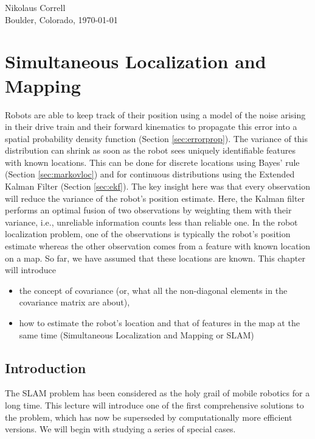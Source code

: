 \documentclass[paper=6.14in:9.21in,pagesize=pdftex,11pt,twoside,openright]{scrbook}
\begin{document}
\begin{flushright}
Nikolaus Correll\\
Boulder, Colorado, \today
\end{flushright}

















\chapter{Simultaneous Localization and Mapping}\label{chap:slam}
Robots are able to keep track of their position using a model of the noise arising in their drive train and their forward kinematics to propagate this error into a spatial probability density function (Section \ref{sec:errorprop}). The variance of this distribution can shrink as soon as the robot sees uniquely identifiable features with known locations. This can be done for discrete locations using Bayes' rule (Section \ref{sec:markovloc}) and for continuous distributions using the Extended Kalman Filter (Section \ref{sec:ekf}). The key insight here was that every observation will reduce the variance of the robot's position estimate. Here, the Kalman filter performs an optimal fusion of two observations by weighting them with their variance, i.e., unreliable information counts less than reliable one. In the robot localization problem, one of the observations is typically the robot's position estimate whereas the other observation comes from a feature with known location on a map. So far, we have assumed that these locations are known. This chapter will introduce

\begin{itemize}
\item the concept of covariance (or, what all the non-diagonal elements in the covariance matrix are about),
\item how to estimate the robot's location and that of features in the map at the same time (Simultaneous Localization and Mapping or SLAM)
\end{itemize}

\section{Introduction}
The SLAM problem has been considered as the holy grail of mobile robotics for a long time. This lecture will introduce one of the first comprehensive solutions to the problem, which has now be superseded by computationally more efficient versions. We will begin with studying a series of special cases.
\end{document}

